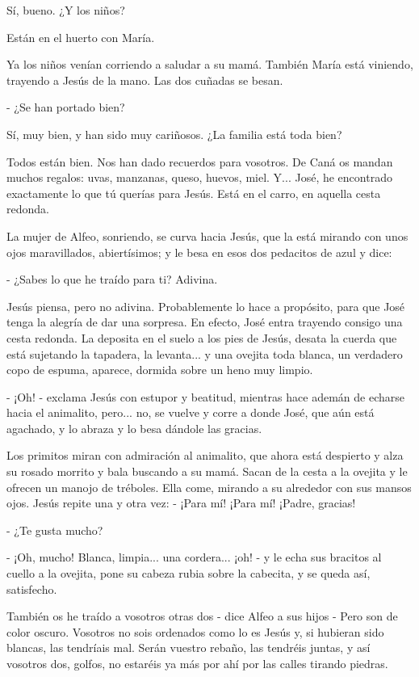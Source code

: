 \documentclass[12pt]{book} %
\begin{document}
Sí, bueno. ¿Y los niños? 

Están en el huerto con María. 

Ya los niños venían corriendo a saludar a su mamá. También María está viniendo, trayendo a Jesús de la mano. Las dos cuñadas se besan. 

- ¿Se han portado bien? 

Sí, muy bien, y han sido muy cariñosos. ¿La familia está toda bien? 

Todos están bien. Nos han dado recuerdos para vosotros. De Caná os mandan muchos regalos: uvas, manzanas, queso, huevos, miel. Y... José, he encontrado exactamente lo que tú querías para Jesús. Está en el carro, en aquella cesta redonda. 

La mujer de Alfeo, sonriendo, se curva hacia Jesús, que la está mirando con unos ojos maravillados, abiertísimos; y le besa en esos dos pedacitos de azul y dice: 

- ¿Sabes lo que he traído para ti? Adivina. 

Jesús piensa, pero no adivina. Probablemente lo hace a propósito, para que José tenga la alegría de dar una sorpresa. En efecto, José entra trayendo consigo una cesta redonda. La deposita en el suelo a los pies de Jesús, desata la cuerda que está sujetando la tapadera, la levanta... y una ovejita toda blanca, un verdadero copo de espuma, aparece, dormida sobre un heno muy limpio. 

- ¡Oh! - exclama Jesús con estupor y beatitud, mientras hace ademán de echarse hacia el animalito, pero... no, se vuelve y corre a donde José, que aún está agachado, y lo abraza y lo besa dándole las gracias. 

Los primitos miran con admiración al animalito, que ahora está despierto y alza su rosado morrito y bala buscando a su mamá. Sacan de la cesta a la ovejita y le ofrecen un manojo de tréboles. Ella come, mirando a su alrededor con sus mansos ojos. Jesús repite una y otra vez: - ¡Para mí! ¡Para mí! ¡Padre, gracias! 

- ¿Te gusta mucho? 

- ¡Oh, mucho! Blanca, limpia... una cordera... ¡oh! - y le echa sus bracitos al cuello a la ovejita, pone su cabeza rubia sobre la cabecita, y se queda así, satisfecho. 

También os he traído a vosotros otras dos - dice Alfeo a sus hijos - Pero son de color oscuro. Vosotros no sois ordenados como lo es Jesús y, si hubieran sido blancas, las tendríais mal. Serán vuestro rebaño, las tendréis juntas, y así vosotros dos, golfos, no estaréis ya más por ahí por las calles tirando piedras. 
\end{document}
